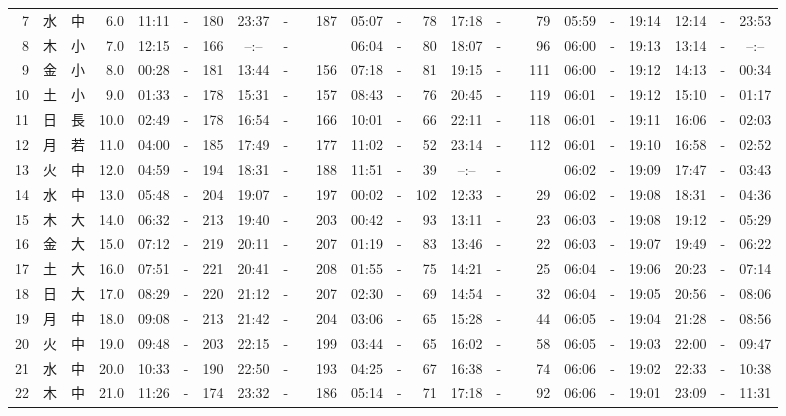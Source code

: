 \documentclass[12pt,a4j]{jsarticle}
\begin{document}
\begin{table}[htbp]
\begin{center}
{\begin{tabular}{|rc|cr|ccrccr|ccrccr|ccc|ccc|}
 7 & 水 & 中 &  6.0 &  11:11 &-& 180 &  23:37 &-& 187 &  05:07 &-&  78 &  17:18 &-&  79 & 05:59 & -& 19:14 & 12:14 & -& 23:53 \\
 8 & 木 & 小 &  7.0 &  12:15 &-& 166 &  --:-- &-&~~~~~ &  06:04 &-&  80 &  18:07 &-&  96 & 06:00 & -& 19:13 & 13:14 & -& --:-- \\
 9 & 金 & 小 &  8.0 &  00:28 &-& 181 &  13:44 &-& 156 &  07:18 &-&  81 &  19:15 &-& 111 & 06:00 & -& 19:12 & 14:13 & -& 00:34 \\
10 & 土 & 小 &  9.0 &  01:33 &-& 178 &  15:31 &-& 157 &  08:43 &-&  76 &  20:45 &-& 119 & 06:01 & -& 19:12 & 15:10 & -& 01:17 \\
11 & 日 & 長 & 10.0 &  02:49 &-& 178 &  16:54 &-& 166 &  10:01 &-&  66 &  22:11 &-& 118 & 06:01 & -& 19:11 & 16:06 & -& 02:03 \\
12 & 月 & 若 & 11.0 &  04:00 &-& 185 &  17:49 &-& 177 &  11:02 &-&  52 &  23:14 &-& 112 & 06:01 & -& 19:10 & 16:58 & -& 02:52 \\
13 & 火 & 中 & 12.0 &  04:59 &-& 194 &  18:31 &-& 188 &  11:51 &-&  39 &  --:-- &-&~~~~~ & 06:02 & -& 19:09 & 17:47 & -& 03:43 \\
14 & 水 & 中 & 13.0 &  05:48 &-& 204 &  19:07 &-& 197 &  00:02 &-& 102 &  12:33 &-&  29 & 06:02 & -& 19:08 & 18:31 & -& 04:36 \\
15 & 木 & 大 & 14.0 &  06:32 &-& 213 &  19:40 &-& 203 &  00:42 &-&  93 &  13:11 &-&  23 & 06:03 & -& 19:08 & 19:12 & -& 05:29 \\
16 & 金 & 大 & 15.0 &  07:12 &-& 219 &  20:11 &-& 207 &  01:19 &-&  83 &  13:46 &-&  22 & 06:03 & -& 19:07 & 19:49 & -& 06:22 \\
17 & 土 & 大 & 16.0 &  07:51 &-& 221 &  20:41 &-& 208 &  01:55 &-&  75 &  14:21 &-&  25 & 06:04 & -& 19:06 & 20:23 & -& 07:14 \\
18 & 日 & 大 & 17.0 &  08:29 &-& 220 &  21:12 &-& 207 &  02:30 &-&  69 &  14:54 &-&  32 & 06:04 & -& 19:05 & 20:56 & -& 08:06 \\
19 & 月 & 中 & 18.0 &  09:08 &-& 213 &  21:42 &-& 204 &  03:06 &-&  65 &  15:28 &-&  44 & 06:05 & -& 19:04 & 21:28 & -& 08:56 \\
20 & 火 & 中 & 19.0 &  09:48 &-& 203 &  22:15 &-& 199 &  03:44 &-&  65 &  16:02 &-&  58 & 06:05 & -& 19:03 & 22:00 & -& 09:47 \\
21 & 水 & 中 & 20.0 &  10:33 &-& 190 &  22:50 &-& 193 &  04:25 &-&  67 &  16:38 &-&  74 & 06:06 & -& 19:02 & 22:33 & -& 10:38 \\
22 & 木 & 中 & 21.0 &  11:26 &-& 174 &  23:32 &-& 186 &  05:14 &-&  71 &  17:18 &-&  92 & 06:06 & -& 19:01 & 23:09 & -& 11:31 \\

\end{tabular}}
\end{center}
\end{table}
\end{document}
